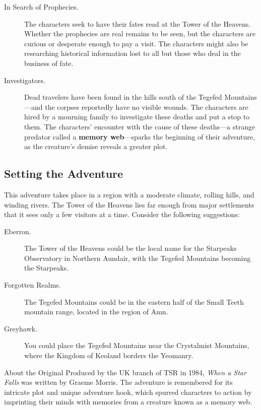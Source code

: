 \documentclass[10pt,a4paper,twoside,bg=print,twocolumn,openany,nodeprecatedcode]{dndbook}
\begin{document}
\begin{description}
\item[In Search of Prophecies.]
The characters seek to have their fates read at the Tower of the Heavens. Whether the prophecies are real remains to be seen, but the characters are curious or desperate enough to pay a visit. The characters might also be researching historical information lost to all but those who deal in the business of fate.
\item[Investigators.]
Dead travelers have been found in the hills south of the Tegefed Mountains—and the corpses reportedly have no visible wounds. The characters are hired by a mourning family to investigate these deaths and put a stop to them. The characters' encounter with the cause of these deaths—a strange predator called a \textbf{memory web}—sparks the beginning of their adventure, as the creature's demise reveals a greater plot.
\end{description}

\subsection{Setting the Adventure}
This adventure takes place in a region with a moderate climate, rolling hills, and winding rivers. The Tower of the Heavens lies far enough from major settlements that it sees only a few visitors at a time. Consider the following suggestions:


\begin{description}
\item[Eberron.]
The Tower of the Heavens could be the local name for the Starpeaks Observatory in Northern Aundair, with the Tegefed Mountains becoming the Starpeaks.
\item[Forgotten Realms.]
The Tegefed Mountains could be in the eastern half of the Small Teeth mountain range, located in the region of Amn.
\item[Greyhawk.]
You could place the Tegefed Mountains near the Crystalmist Mountains, where the Kingdom of Keoland borders the Yeomanry.
\end{description}

\begin{DndReadAloud}{About the Original}
Produced by the UK branch of TSR in 1984, \textit{When a Star Falls} was written by Graeme Morris. The adventure is remembered for its intricate plot and unique adventure hook, which spurred characters to action by imprinting their minds with memories from a creature known as a memory web.

\end{DndReadAloud}
\end{document}
